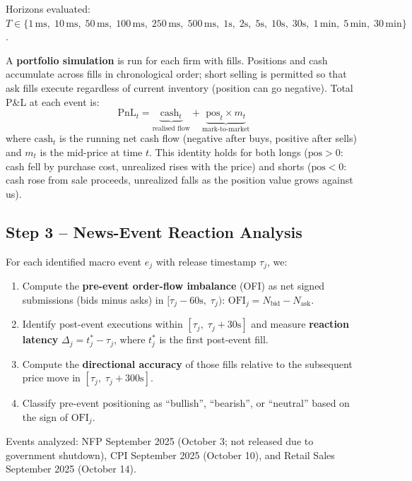 \documentclass[11pt, letterpaper]{article}
\begin{document}
Horizons evaluated: $T \in \{1\,\text{ms},\; 10\,\text{ms},\; 50\,\text{ms},\;
100\,\text{ms},\; 250\,\text{ms},\; 500\,\text{ms},\; 1\text{s},\; 2\text{s},\;
5\text{s},\; 10\text{s},\; 30\text{s},\; 1\,\text{min},\; 5\,\text{min},\;
30\,\text{min}\}$.

A \textbf{portfolio simulation} is run for each firm with fills.
Positions and cash accumulate across fills in chronological order; short
selling is permitted so that ask fills execute regardless of current
inventory (position can go negative).
Total P\&L at each event is:
\[
  \text{PnL}_t = \underbrace{\text{cash}_t}_{\text{realised flow}}
               + \underbrace{\text{pos}_t \times m_t}_{\text{mark-to-market}}
\]
where $\text{cash}_t$ is the running net cash flow (negative after buys,
positive after sells) and $m_t$ is the mid-price at time $t$.
This identity holds for both longs ($\text{pos}>0$: cash fell by purchase
cost, unrealized rises with the price) and shorts ($\text{pos}<0$: cash
rose from sale proceeds, unrealized falls as the position value grows
against us).

\subsection{Step 3 -- News-Event Reaction Analysis}

For each identified macro event $e_j$ with release timestamp $\tau_j$, we:
\begin{enumerate}[noitemsep]
  \item Compute the \textbf{pre-event order-flow imbalance} (OFI) as net signed
    submissions (bids minus asks) in $[\tau_j - 60\text{s},\; \tau_j)$:
    $\text{OFI}_j = N_{\text{bid}} - N_{\text{ask}}$.
  \item Identify post-event executions within $[\tau_j,\; \tau_j + 30\text{s}]$
    and measure \textbf{reaction latency}
    $\Delta_j = t^*_j - \tau_j$, where $t^*_j$ is the first post-event fill.
  \item Compute the \textbf{directional accuracy} of those fills relative to
    the subsequent price move in $[\tau_j,\; \tau_j + 300\text{s}]$.
  \item Classify pre-event positioning as ``bullish'', ``bearish'', or
    ``neutral'' based on the sign of $\text{OFI}_j$.
\end{enumerate}
Events analyzed: NFP September 2025 (October 3; not released due to government
shutdown), CPI September 2025 (October 10), and Retail Sales September 2025
(October 14).
\end{document}
